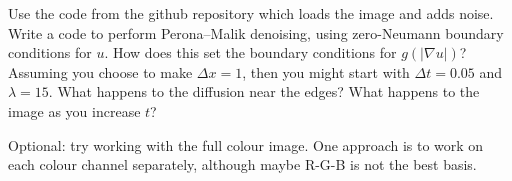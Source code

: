 \documentclass[12pt,a4paper]{article}
\begin{document}
Use the code from the github repository which loads the image and adds
noise.  Write a code to perform Perona--Malik denoising, using zero-Neumann boundary conditions for $u$. How does this set the boundary conditions for $g(|\nabla u|)$? Assuming you choose to make $\Delta x = 1$, then you might start with $\Delta t = 0.05$
and $\lambda = 15$. What happens to the diffusion near the edges? What happens to the image as you increase $t$?

Optional: try working with the full colour image.  One approach is to
work on each colour channel separately, although maybe R-G-B is not
the best basis.




\end{document}
